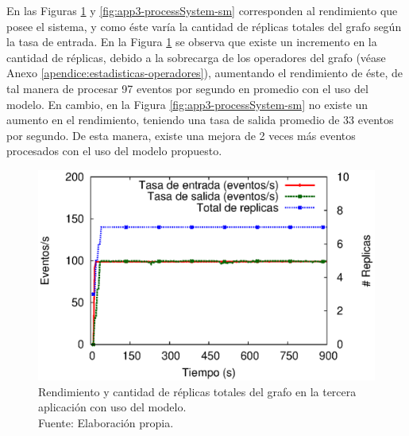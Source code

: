 
En las Figuras \ref{fig:app3-processSystem-cm} y \ref{fig:app3-processSystem-sm} \normalsize{corresponden al rendimiento que posee el sistema, y como éste varía la cantidad de réplicas totales del grafo según la tasa de entrada.} En la Figura \ref{fig:app3-processSystem-cm} \normalsize{se observa que existe un incremento en la cantidad de réplicas, debido a la sobrecarga de los operadores del grafo} (véase Anexo \ref{apendice:estadisticas-operadores}), \normalsize{aumentando el rendimiento de éste, de tal manera de procesar 97 eventos por segundo en promedio con el uso del modelo. En cambio, en la Figura} \ref{fig:app3-processSystem-sm} \normalsize{no existe un aumento en el rendimiento, teniendo una tasa de salida promedio de 33 eventos por segundo. De esta manera, existe una mejora de 2 veces más eventos procesados con el uso del modelo propuesto.}

\begin{figure}[!ht]
	\centering
	\captionsetup{justification=centering}
	\includegraphics[scale=0.7]{images/exp/app3/cm/logical/processSystem.eps}
    \caption[Rendimiento y cantidad de réplicas totales del grafo en la tercera aplicación con uso del modelo.]{Rendimiento y cantidad de réplicas totales del grafo en la tercera aplicación con uso del modelo.\\Fuente: Elaboración propia.}
	\label{fig:app3-processSystem-cm}
\end{figure}

